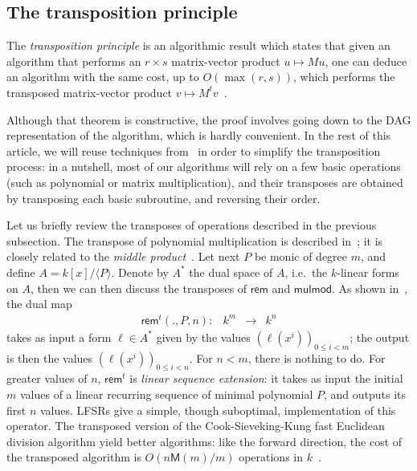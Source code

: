 \documentclass{sig-alternate}
\def\M {\ensuremath{\mathsf{M}}}
\def\rem {\ensuremath{\mathsf{rem}}}
\def\mulmod {\ensuremath{\mathsf{mulmod}}}
\newcounter{algo}
\newcommand{\ang}[1]{\langle#1\rangle}
\begin{document}

\subsection{The transposition principle}
\label{sec:algor-dual-basis}

The {\em transposition principle} is an algorithmic result which
states that given an algorithm that performs an $r \times s$
matrix-vector product $u \mapsto M u$, one can deduce an algorithm
with the same cost, up to $O(\max(r,s))$, which performs the
transposed matrix-vector product $v \mapsto M^t
v$~\cite[Ch.~13]{burgisser+clausen-shokrollahi}.

Although that theorem is constructive, the proof involves going down
to the DAG representation of the algorithm, which is hardly
convenient.  In the rest of this article, we will reuse techniques
from~\cite{bostan+lecerf+schost:tellegen} in order to simplify the
transposition process: in a nutshell, most of our algorithms will rely
on a few basic operations (such as polynomial or matrix
multiplication), and their transposes are obtained by transposing each
basic subroutine, and reversing their order.

Let us briefly review the transposes of operations described in the
previous subsection. The transpose of polynomial multiplication is
described in~\cite{bostan+lecerf+schost:tellegen}; it is closely
related to the {\em middle product}~\cite{hanrot+quercia+zimmermann}.
Let next $P$ be monic of degree $m$, and define
$A=k[x]/\ang{P}$. Denote by $A^\ast$ the dual space of $A$, i.e.\ the
$k$-linear forms on $A$, then we can then discuss the transposes of
$\rem$ and $\mulmod$. As shown
in~\cite{bostan+lecerf+schost:tellegen}, the dual map
$$
\begin{array}{cccc}
\rem^t(.,P,n): &k^m& \to &k^n
\end{array}$$ 
takes as input a form $\ell\in A^\ast$ given by the values
$(\ell(x^i))_{0 \le i < m}$; the output is then the values
$(\ell(x^i))_{0 \le i < n}$. For $n < m$, there is nothing to do. For
greater values of $n$, $\rem^t$ is \emph{linear sequence extension}:
it takes as input the initial $m$ values of a linear recurring
sequence of minimal polynomial $P$, and outputs its first $n$ values.
LFSRs give a simple, though suboptimal, implementation of this
operator. The transposed version of the Cook-Sieveking-Kung fast
Euclidean division algorithm yield better algorithms: like the
forward direction, the cost of the transposed algorithm is
$O(n\M(m)/m)$ operations in $k$~\cite{vzgathen+shoup92:journal,shoup99}.
\end{document}
